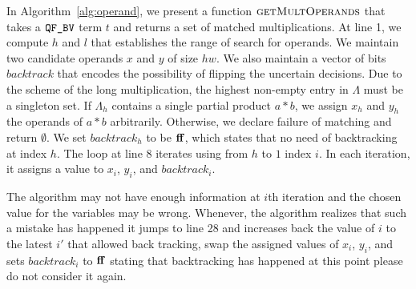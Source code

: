 In Algorithm~\ref{alg:operand}, we present a function
$\textsc{getMultOperands}$ that takes a $\texttt{QF\_BV}$ term $t$ and returns a
set of matched multiplications.
%
At line 1, we compute $h$ and $l$ that establishes the range of search for
operands.
%
We maintain two candidate operands $x$ and $y$ of size $hw$.
%
We also maintain a vector of bits $backtrack$ that encodes 
the possibility of flipping the uncertain decisions.
%
Due to the scheme of the long multiplication, the highest
non-empty entry in $\Lambda$ must be a singleton set.
%
If $\Lambda_h$ contains a single partial product $a*b$,
we assign $x_h$ and $y_h$ the operands of $a*b$ arbitrarily.
%
Otherwise, we declare failure of matching and return $\emptyset$.
%
We set $backtrack_h$ to be $\mathbf{ff}$, which states that
no need of backtracking at index $h$.
%
The loop at line 8 iterates using from $h$ to $1$ index $i$.
%
In each iteration, it assigns a value to $x_i$, $y_i$, and $backtrack_i$. 
%

The algorithm may not have enough information at $i$th iteration and
the chosen value for the variables may be wrong.
%
Whenever, the algorithm realizes that such a mistake has happened
it jumps to line 28 and increases back the value of $i$
to the latest $i'$ that allowed back tracking,
swap the assigned values of $x_i$, $y_i$, and sets $backtrack_i$ to
$\mathbf{ff}$ stating that backtracking has happened at this point
please do not consider it again.
%

